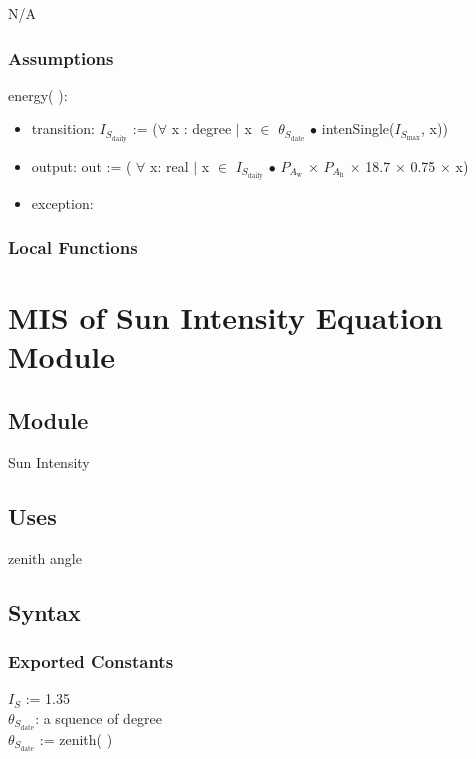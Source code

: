 \documentclass[12pt, titlepage]{article}
\begin{document}
N/A

\subsubsection{Assumptions}


\noindent  energy( ):
\begin{itemize}
\item transition: $I_{S_{\text{daily}}}$ := ($\forall$ x : degree $|$ x $\in$ $\theta_{S_{\text{date}}}$ $\bullet$ intenSingle($I_{S_{\text{max}}}$, x))

\item output: out := ( $\forall$ x: real $|$ x $\in$ $I_{S_{\text{daily}}}$ $\bullet$ $P_{A_{\text{w}}}$ $\times$ $P_{A_{\text{h}}}$ $\times$ 18.7 $\times$ 0.75 $\times$ x)
 
\item exception: 
\end{itemize}


\subsubsection{Local Functions}


\section{MIS of Sun Intensity Equation Module} \label{ModuleSI} 



\subsection{Module}
Sun Intensity

\subsection{Uses}
zenith angle

\subsection{Syntax}

\subsubsection{Exported Constants}
$I_{S}$ := 1.35\\
$\theta_{S_{\text{date}}}$: a squence of degree\\
$\theta_{S_{\text{date}}}$ := zenith( )
\end{document}
